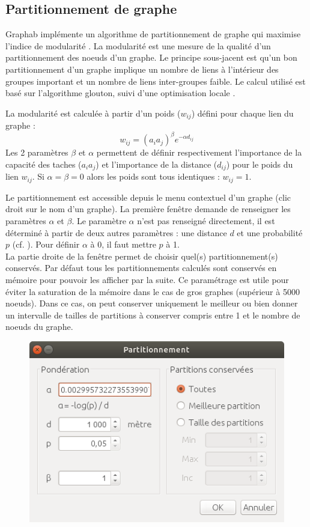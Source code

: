 \documentclass{article}
\begin{document}
\subsection{Partitionnement de graphe}

Graphab implémente un algorithme de partitionnement de graphe qui maximise l'indice de modularité \cite{Newman2006}. La modularité est une mesure de la qualité d'un partitionnement des noeuds d'un graphe. Le principe sous-jacent est qu'un bon partitionnement d'un graphe implique un nombre de liens à l'intérieur des groupes important et un nombre de liens inter-groupes faible. Le calcul utilisé est basé sur l'algorithme glouton, suivi d'une optimisation locale \cite{Brandes2008}.

La modularité est calculée à partir d'un poids ($w_{ij}$) défini pour chaque lien du graphe :
$$w_{ij} = (a_i a_j)^\beta e^{-\alpha d_{ij}}$$
Les 2 paramètres $\beta$ et $\alpha$ permettent de définir respectivement l'importance de la capacité des taches ($a_i a_j$) et l'importance de la distance ($d_{ij}$) pour le poids du lien $w_{ij}$. Si $\alpha = \beta = 0$ alors les poids sont tous identiques : $w_{ij} = 1$.

Le partitionnement est accessible depuis le menu contextuel d'un graphe (clic droit sur le nom d'un graphe). La première fenêtre demande de renseigner les paramètres $\alpha$ et $\beta$. Le paramètre $\alpha$ n'est pas renseigné directement, il est déterminé à partir de deux autres paramètres : une distance $d$ et une probabilité $p$ (cf. ). Pour définir $\alpha$ à 0, il faut mettre $p$ à 1.\\
La partie droite de la fenêtre permet de choisir quel(s) partitionnement(s) conservés. Par défaut tous les partitionnements calculés sont conservés en mémoire pour pouvoir les afficher par la suite. Ce paramétrage est utile pour éviter la saturation de la mémoire dans le cas de gros graphes (supérieur à 5000 noeuds). Dans ce cas, on peut conserver uniquement le meilleur ou bien donner un intervalle de tailles de partitions à conserver compris entre 1 et le nombre de noeuds du graphe.

\begin{figure}[H]
	\includegraphics[scale=0.36]{img/manual-fr_clustering.png} 
\end{figure}
\end{document}

